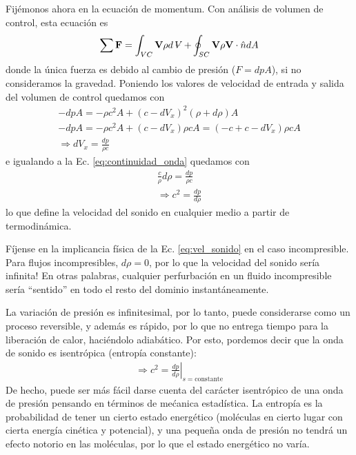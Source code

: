 Fijémonos ahora en la ecuación de momentum. 
Con análisis de volumen de control, esta ecuación es
%
\begin{equation}
\sum \mathbf{F} = \int_{VC}\mathbf{V}\rho d\vol + \oint_{SC}\mathbf{V}\rho \mathbf{V}\cdot\hat{n}dA
\end{equation}
%
donde la única fuerza es debido al cambio de presión ($F=dpA$), si no consideramos la gravedad.
Poniendo los valores de velocidad de entrada y salida del volumen de control quedamos con
%
\begin{align}\label{eq:momentum_onda}
-dpA = -\rho c^2A + (c-dV_x)^2(\rho+d\rho)A\nonumber\\
-dpA = -\rho c^2A + (c-dV_x)\rho cA = (-c+c-dV_x)\rho cA\nonumber\\
\Rightarrow dV_x = \frac{dp}{\rho c}
\end{align}
%
e igualando a la Ec. \eqref{eq:continuidad_onda} quedamos con
%
\begin{align}\label{eq:vel_sonido}
\frac{c}{\rho}d\rho = \frac{dp}{\rho c}\nonumber\\
\Rightarrow c^2 = \frac{dp}{d\rho}
\end{align}
%
lo que define la velocidad del sonido en cualquier medio a partir de termodinámica.

Fíjense en la implicancia física de la Ec. \eqref{eq:vel_sonido} en el caso incompresible.
Para flujos incompresibles, $d\rho=0$, por lo que la velocidad del sonido sería infinita!
En otras palabras, cualquier perfurbación en un fluido incompresible sería ``sentido'' en todo el resto del dominio instantáneamente.

La variación de presión es infinitesimal, por lo tanto, puede considerarse como un proceso reversible, y además es rápido, por lo que no entrega tiempo para la liberación de calor, haciéndolo adiabático.
Por esto, pordemos decir que la onda de sonido es isentrópica (entropía constante):
%
\begin{align}\label{eq:vel_sonido}
\Rightarrow c^2 = \left.\frac{dp}{d\rho}\right|_{s=\text{constante}}
\end{align}
%
De hecho, puede ser más fácil darse cuenta del carácter isentrópico de una onda de presión pensando en términos de mećanica estadística.
La entropía es la probabilidad de tener un cierto estado energético (moléculas en cierto lugar con cierta energía cinética y potencial), y una pequeña onda de presión no tendrá un efecto notorio en las moléculas, por lo que el estado energético no varía.

